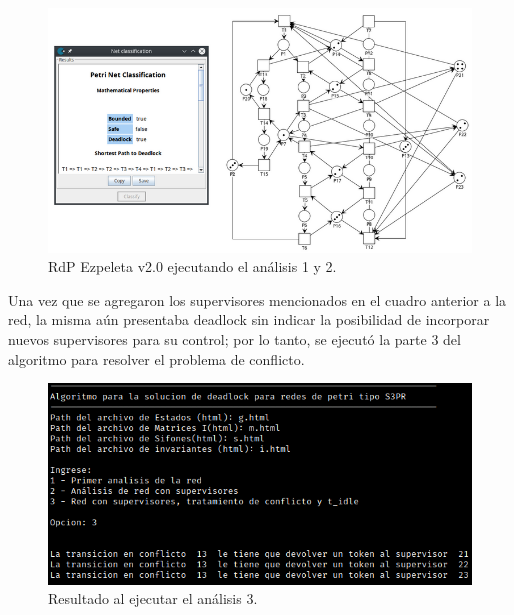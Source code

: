 \begin{figure}[H]
	\centering
	\includegraphics[width=\textwidth]{Figures/algoritmo4/ezpeleta_v2_imag2.png}
	\caption{RdP Ezpeleta v2.0 ejecutando el análisis 1 y 2.}
	\label{fig:Rdp-Ezpeletav21y2v4}
\end{figure}

Una vez que se agregaron los supervisores mencionados en el cuadro anterior a la red, la misma aún presentaba deadlock sin indicar la posibilidad de incorporar nuevos supervisores para su control; por lo tanto, se ejecutó la parte 3 del algoritmo para resolver el problema de conflicto.
\bigskip
 
 
 
\begin{figure}[H]
	\centering
	\includegraphics[width=\textwidth]{Figures/algoritmo4/terminal-EzpeletaV2-Ejec3.png}
	\caption{Resultado al ejecutar el análisis 3.}
	\label{fig:Rdp-Ezpeletav23v4}
\end{figure}
\bigskip

